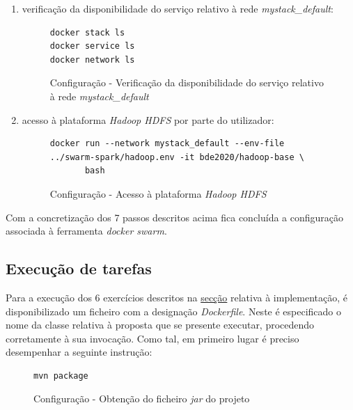 \documentclass[a4paper]{report}
\begin{document}
{\begin{enumerate}[label=\textbf{\arabic*.}]
                \item verificação da disponibilidade do serviço relativo à rede \textit{mystack\_default}:
                \begin{figure}[H]
                    \centering
                    \begin{verbatim}
docker stack ls
docker service ls
docker network ls
                    \end{verbatim}
                    \vspace{-5mm}
                    \caption{Configuração - Verificação da disponibilidade do serviço relativo à rede \textit{mystack\_default}}
                    \label{fig:12}
                \end{figure}

                \item acesso à plataforma \textit{Hadoop HDFS} por parte do utilizador:
                \begin{figure}[H]
                    \centering
                    \begin{verbatim}
docker run --network mystack_default --env-file ../swarm-spark/hadoop.env -it bde2020/hadoop-base \
       bash
                    \end{verbatim}
                    \vspace{-5mm}
                    \caption{Configuração - Acesso à plataforma \textit{Hadoop HDFS}}
                    \label{fig:13}
                \end{figure}
            \end{enumerate}}

            Com a concretização dos 7 passos descritos acima fica concluída a configuração associada à ferramenta \textit{docker swarm}.
        
        \subsection{Execução de tarefas}
        Para a execução dos 6 exercícios descritos na \hyperref[ch:Implementation]{secção} relativa à implementação, é disponibilizado um ficheiro com a designação \textit{Dockerfile}.
        Neste é especificado o nome da classe relativa à proposta que se presente executar, procedendo corretamente à sua invocação.
        Como tal, em primeiro lugar é preciso desempenhar a seguinte instrução:
        \begin{figure}[H]
            \centering
            \begin{verbatim}
mvn package
            \end{verbatim}
            \vspace{-5mm}
            \caption{Configuração - Obtenção do ficheiro \textit{jar} do projeto}
            \label{fig:14}
        \end{figure}
        
\end{document}
